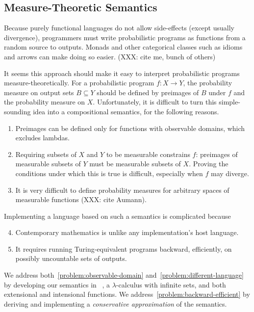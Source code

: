 \documentclass[preprint]{sigplanconf}
\begin{document}
\subsection{Measure-Theoretic Semantics}

Because purely functional languages do not allow side-effects (except usually divergence), programmers must write probabilistic programs as functions from a random source to outputs.
Monads and other categorical classes such as idioms and arrows can make doing so easier. (XXX: cite me, bunch of others)

It seems this approach should make it easy to interpret probabilistic programs measure-theoretically.
For a probabilistic program $f : X \to Y$, the probability measure on output sets $B \subseteq Y$ should be defined by preimages of $B$ under $f$ and the probability measure on $X$.
Unfortunately, it is difficult to turn this simple-sounding idea into a compositional semantics, for the following reasons.
\begin{enumerate}
	\item Preimages can be defined only for functions with observable domains, which excludes lambdas. \label{problem:observable-domain}
	\item Requiring subsets of $X$ and $Y$ to be measurable constrains $f$: preimages of measurable subsets of $Y$ must be measurable subsets of $X$. Proving the conditions under which this is true is difficult, especially when $f$ may diverge. \label{problem:measurability}
	\item It is very difficult to define probability measures for arbitrary spaces of measurable functions (XXX: cite Aumann). \label{problem:higher-orderness}
\end{enumerate}
Implementing a language based on such a semantics is complicated because
\begin{enumerate}
	\setcounter{enumi}{3}
	\item Contemporary mathematics is unlike any implementation's host language. \label{problem:different-language}
	\item It requires running Turing-equivalent programs backward, efficiently, on possibly uncountable sets of outputs.\label{problem:backward-efficient}
\end{enumerate}

We address both~\ref{problem:observable-domain} and~\ref{problem:different-language} by developing our semantics in \lzfclang~\cite{cit:toronto-2012flops-lzfc}, a $\lambda$-calculus with infinite sets, and both extensional and intensional functions.
We address~\ref{problem:backward-efficient} by deriving and implementing a \emph{conservative approximation} of the semantics.
\end{document}
